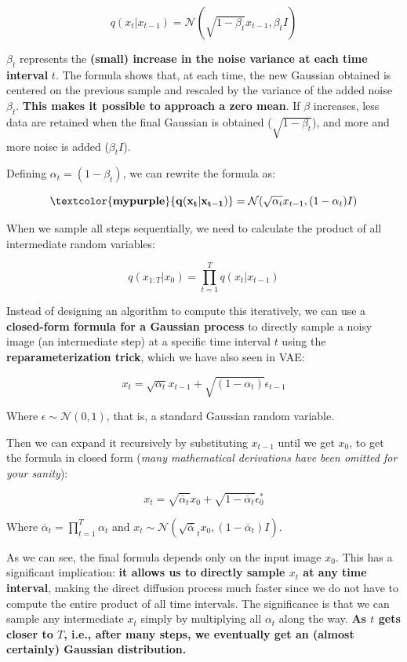 $$q(x_{t}|x_{t-1}) = \mathcal{N}(\sqrt{1-\beta_t}x_{t-1}, \beta_t I)$$

$\beta_t$ represents the \textbf{(small) increase in the noise variance at each time interval} $t$. The formula shows that, at each time, the new Gaussian obtained is centered on the previous sample and rescaled by the variance of the added noise $\beta_t$. \textbf{This makes it possible to approach a zero mean}. If $\beta$ increases, less data are retained when the final Gaussian is obtained ($\sqrt{1-\beta_t}$), and more and more noise is added ($\beta_t I$).

Defining $\alpha_t = (1- \beta_t)$, we can rewrite the formula as:

$$\mathbf{\textcolor{mypurple}{q(x_{t}|x_{t-1})}} = \mathcal{N}(\sqrt{\alpha_t}x_{t-1}, (1-\alpha_t) I)$$

When we sample all steps sequentially, we need to calculate the product of all intermediate random variables:

$$q(x_{1:T}|x_0) = \prod_{t=1}^{T} q(x_t|x_{t-1})$$

Instead of designing an algorithm to compute this iteratively, we can use a \textbf{closed-form formula for a Gaussian process} to directly sample a noisy image (an intermediate step) at a specific time interval $t$ using the \textbf{reparameterization trick}, which we have also seen in VAE:

$$
x_t = \sqrt{\alpha_t}x_{t-1} + \sqrt{(1-\alpha_t)} \epsilon_{t-1}
$$

Where $\epsilon \sim \mathcal{N}(0,1)$, that is, a standard Gaussian random variable.

Then we can expand it recursively by substituting $x_{t-1}$ until we get $x_0$, to get the formula in closed form (\textit{many mathematical derivations have been omitted for your sanity}):

$$x_t = \sqrt{\overline{\alpha}_t}x_{0} + \sqrt{1-\overline{\alpha}_t}\epsilon_0^*$$

Where $\overline{\alpha}_t = \prod_{t=1}^{T}\alpha_t $ and $x_t \sim \mathcal{N}(\sqrt{\overline{\alpha}}_t x_0, (1- \overline{\alpha}_t)I)$.

As we can see, the final formula depends only on the input image $x_0$. This has a significant implication: \textbf{it allows us to directly sample $x_t$ at any time interval}, making the direct diffusion process much faster since we do not have to compute the entire product of all time intervals. The significance is that we can sample any intermediate $x_t$ simply by multiplying all $\alpha_{t}$ along the way. \textbf{As $t$ gets closer to $T$, i.e., after many steps, we eventually get an (almost certainly) Gaussian distribution.}


